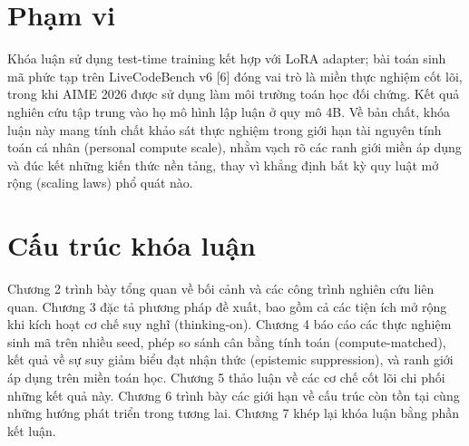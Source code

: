\section{Phạm vi}\label{scope}

Khóa luận sử dụng test-time training kết hợp với LoRA adapter; bài toán sinh mã phức tạp trên LiveCodeBench v6 {[}6{]} đóng vai trò là miền thực nghiệm cốt lõi, trong khi AIME 2026 được sử dụng làm môi trường toán học đối chứng. Kết quả nghiên cứu tập trung vào họ mô hình lập luận ở quy mô 4B. Về bản chất, khóa luận này mang tính chất khảo sát thực nghiệm trong giới hạn tài nguyên tính toán cá nhân (personal compute scale), nhằm vạch rõ các ranh giới miền áp dụng và đúc kết những kiến thức nền tảng, thay vì khẳng định bất kỳ quy luật mở rộng (scaling laws) phổ quát nào.

\section{Cấu trúc khóa luận}\label{thesis-structure}

Chương 2 trình bày tổng quan về bối cảnh và các công trình nghiên cứu liên quan. Chương 3 đặc tả phương pháp đề xuất, bao gồm cả các tiện ích mở rộng khi kích hoạt cơ chế suy nghĩ (thinking-on). Chương 4 báo cáo các thực nghiệm sinh mã trên nhiều seed, phép so sánh cân bằng tính toán (compute-matched), kết quả về sự suy giảm biểu đạt nhận thức (epistemic suppression), và ranh giới áp dụng trên miền toán học. Chương 5 thảo luận về các cơ chế cốt lõi chi phối những kết quả này. Chương 6 trình bày các giới hạn về cấu trúc còn tồn tại cùng những hướng phát triển trong tương lai. Chương 7 khép lại khóa luận bằng phần kết luận.
